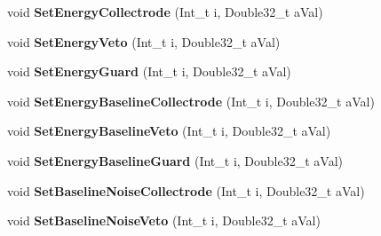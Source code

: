 \begin{DoxyCompactItemize}
\item 
\hypertarget{class_edw_h_l_a_single_bolo_sub_record_a7931527ef464a1b6abc375974c674b8a}{
void {\bfseries SetEnergyCollectrode} (Int\_\-t i, Double32\_\-t aVal)}
\label{class_edw_h_l_a_single_bolo_sub_record_a7931527ef464a1b6abc375974c674b8a}

\item 
\hypertarget{class_edw_h_l_a_single_bolo_sub_record_a772b04ab504fcb376a65a30a4802eac8}{
void {\bfseries SetEnergyVeto} (Int\_\-t i, Double32\_\-t aVal)}
\label{class_edw_h_l_a_single_bolo_sub_record_a772b04ab504fcb376a65a30a4802eac8}

\item 
\hypertarget{class_edw_h_l_a_single_bolo_sub_record_a63966f68c2c14179a9faada77b90d93a}{
void {\bfseries SetEnergyGuard} (Int\_\-t i, Double32\_\-t aVal)}
\label{class_edw_h_l_a_single_bolo_sub_record_a63966f68c2c14179a9faada77b90d93a}

\item 
\hypertarget{class_edw_h_l_a_single_bolo_sub_record_ad8a7866ee8f30265d4dabb9cf208629d}{
void {\bfseries SetEnergyBaselineCollectrode} (Int\_\-t i, Double32\_\-t aVal)}
\label{class_edw_h_l_a_single_bolo_sub_record_ad8a7866ee8f30265d4dabb9cf208629d}

\item 
\hypertarget{class_edw_h_l_a_single_bolo_sub_record_ae0ed61d3e07a31f14b7e77b6ecc406c6}{
void {\bfseries SetEnergyBaselineVeto} (Int\_\-t i, Double32\_\-t aVal)}
\label{class_edw_h_l_a_single_bolo_sub_record_ae0ed61d3e07a31f14b7e77b6ecc406c6}

\item 
\hypertarget{class_edw_h_l_a_single_bolo_sub_record_acba626dac712172d6723c89727b0a114}{
void {\bfseries SetEnergyBaselineGuard} (Int\_\-t i, Double32\_\-t aVal)}
\label{class_edw_h_l_a_single_bolo_sub_record_acba626dac712172d6723c89727b0a114}

\item 
\hypertarget{class_edw_h_l_a_single_bolo_sub_record_ab2a16227184e7b25ab0811d56f6078ca}{
void {\bfseries SetBaselineNoiseCollectrode} (Int\_\-t i, Double32\_\-t aVal)}
\label{class_edw_h_l_a_single_bolo_sub_record_ab2a16227184e7b25ab0811d56f6078ca}

\item 
\hypertarget{class_edw_h_l_a_single_bolo_sub_record_a694aede42c45750d0b02005241a7436a}{
void {\bfseries SetBaselineNoiseVeto} (Int\_\-t i, Double32\_\-t aVal)}
\label{class_edw_h_l_a_single_bolo_sub_record_a694aede42c45750d0b02005241a7436a}


\end{DoxyCompactItemize}
